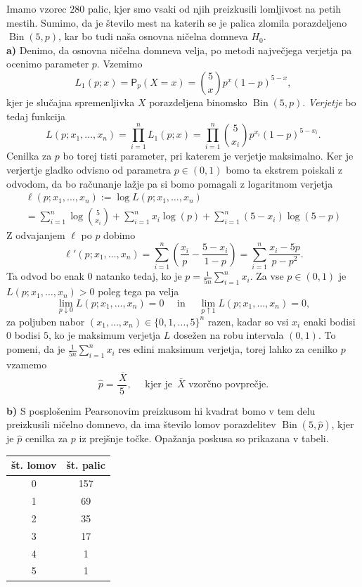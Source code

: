 \documentclass[a4paper,11pt]{article}
\newcommand{\olsi}[1]{\,\overline{\!{#1}}} %
\newcommand{\sumin}{\sum_{i = 1}^n}
\DeclareMathOperator{\bin}{Bin}
\begin{document}
Imamo vzorec $280$ palic, kjer smo vsaki od njih preizkusili lomljivost na petih mestih. Sumimo, da je število mest na katerih se je palica zlomila porazdeljeno $\bin(5,p)$, kar bo tudi naša osnovna ničelna domneva $H_0$.
\\

\noindent
\textbf{a)} Denimo, da osnovna ničelna domneva velja, po metodi največjega verjetja pa ocenimo parameter $p$. Vzemimo
\[
    L_1(p; x) = \mathsf{P}_p(X = x) = \binom{5}{x}p^x(1-p)^{5 - x},
\]
kjer je slučajna spremenljivka $X$ porazdeljena binomsko $\bin(5,p)$. \emph{Verjetje} bo tedaj funkcija
\[
    L(p; x_1, \ldots, x_n) = \prod_{i = 1}^n L_1(p; x) = \prod_{i = 1}^n \binom{5}{x_i}p^{x_i}(1-p)^{5 - x_i}.
\]
Cenilka za $p$ bo torej tisti parameter, pri katerem je verjetje maksimalno. Ker je verjertje gladko odvisno od parametra $p \in (0,1)$ bomo ta ekstrem poiskali z odvodom, da bo računanje lažje pa si bomo pomagali z logaritmom verjetja
\begin{multline*}
    \ell(p; x_1, \ldots, x_n) := 
    \log L(p; x_1, \ldots, x_n) \\ 
    = \sumin \log\binom{5}{x_i} + \sumin x_i\log(p) + \sumin(5 - x_i) \log(5 - p)
\end{multline*}
Z odvajanjem $\ell$ po $p$ dobimo
\[
    \ell'(p; x_1, \ldots, x_n) =
    \sumin \left( \frac{x_i}{p} - \frac{5 - x_i}{1 - p}\right) = 
    \sumin \frac{x_i - 5p}{p - p^2}.
\]
Ta odvod bo enak $0$ natanko tedaj, ko je $p = \frac{1}{5n} \sumin x_i$. Za vse $p \in (0,1)$ je $L(p; x_1, \ldots, x_n) > 0$ poleg tega pa velja
\[
    \lim_{p \downarrow  0} L(p; x_1, \ldots, x_n) = 0 \quad \text{ in } \quad 
    \lim_{p \uparrow  1} L(p; x_1, \ldots, x_n) = 0,
\]
za poljuben nabor $(x_1, \ldots, x_n) \in \{0,1,\ldots, 5\}^n$ razen, kadar so vsi $x_i$ enaki bodisi $0$ bodisi $5$, ko je maksimum verjetja $L$ dosežen na robu intervala $(0,1)$. To pomeni, da je $\frac{1}{5n} \sumin x_i$ res edini maksimum verjetja, torej lahko za cenilko $p$ vzamemo  
\[
    \hat{p} = \frac{\olsi{X}}{5}, \quad \text{ kjer je $\olsi{X}$ vzorčno povprečje.}  
\]

\noindent
\textbf{b)} S posplošenim Pearsonovim preizkusom hi kvadrat \cite[\S 9.5]{Rice} bomo v tem delu preizkusili ničelno domnevo, da ima število lomov porazdelitev $\bin(5,\hat{p})$, kjer je $\hat{p}$ cenilka za $p$ iz prejšnje točke. Opažanja poskusa so prikazana v tabeli. 
\begin{center}
\begin{tabular}{|| c | c ||}
    \hline
    št. lomov & št. palic \\
    \hline 
    \hline 
    0 & 157 \\
    \hline
    1 & 69 \\
    \hline
    2 & 35 \\
    \hline
    3 & 17 \\
    \hline
    4 & 1 \\
    \hline
    5 & 1 \\
    \hline
\end{tabular}
\end{center}
\end{document}
